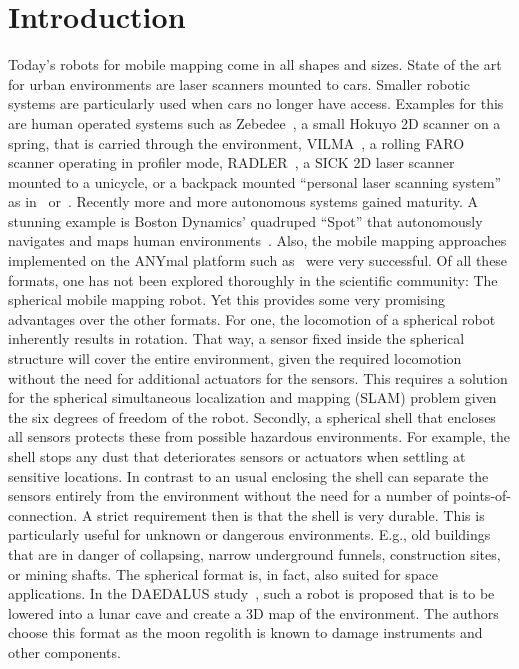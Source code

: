 \section{Introduction}

Today's robots for mobile mapping come in all shapes and sizes.
State of the art for urban environments are laser scanners mounted to cars.
Smaller robotic systems are particularly used when cars no longer have access.
Examples for this are human operated systems such as Zebedee~\cite{Bosse2012-zebedee}, a small Hokuyo 2D scanner on a spring, that is carried through the environment, VILMA~\cite{JPRS2016}, a rolling FARO scanner operating in profiler mode, RADLER~\cite{Borrmann2020-RADLER}, a SICK 2D laser scanner mounted to a unicycle, or a backpack mounted ``personal laser scanning system'' as in~\cite{LauterbackEtAl2015-Backpack} or~\cite{WWWLeicaBackpack}.
Recently more and more autonomous systems gained maturity.
A stunning example is Boston Dynamics' quadruped ``Spot'' that autonomously navigates and maps human environments~\cite{SpotRobot}.
Also, the mobile mapping approaches implemented on the ANYmal platform such as~\cite{Fankhauser2018-ANYmal} were very successful.
Of all these formats, one has not been explored thoroughly in the scientific community: The spherical mobile mapping robot.
Yet this provides some very promising advantages over the other formats.
For one, the locomotion of a spherical robot inherently results in rotation.
That way, a sensor fixed inside the spherical structure will cover the entire environment, given the required locomotion without the need for additional actuators for the sensors.
This requires a solution for the spherical simultaneous localization and mapping (SLAM) problem given the six degrees of freedom of the robot.
Secondly, a spherical shell that encloses all sensors protects these from possible hazardous environments.  
For example, the shell stops any dust that deteriorates sensors or actuators when settling at sensitive locations.
In contrast to an usual enclosing the shell can separate the sensors entirely from the environment without the need for a number of points-of-connection. 
A strict requirement then is that the shell is very durable.
This is particularly useful for unknown or dangerous environments.
E.g., old buildings that are in danger of collapsing, narrow underground funnels, construction sites, or mining shafts. 
The spherical format is, in fact, also suited for space applications.
In the DAEDALUS study~\cite{RossiMaurelliUnnithanetal.2021}, such a robot is proposed that is to be lowered into a lunar cave and create a 3D map of the environment. The authors choose this format as the moon regolith is known to damage instruments and other components.
